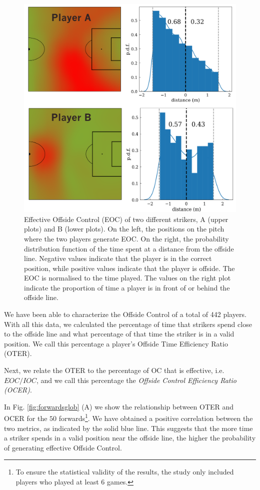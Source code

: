 \documentclass[
  10pt,
  twoside,nohyper]{book}
\begin{document}
\begin{figure}[H]

{\centering \includegraphics[width=0.7\linewidth,]{imagenes/forwards_OC} 

}

\caption{Effective Offside Control (EOC) of two different strikers, A (upper plots) and B (lower plots). On the left, the positions on the pitch where the two players generate EOC. On the right, the probability distribution function of the time spent at a distance from the offside line. Negative values indicate that the player is in the correct position, while positive values indicate that the player is offside. The EOC is normalised to the time played. The values on the right plot indicate the proportion of time a player is in front of or behind the offside line.}\label{fig:forwards}
\end{figure}

We have been able to characterize the Offside Control of a total of 442 players. With all this data, we calculated the percentage of time that strikers spend close to the offside line and what percentage of that time the striker is in a valid position. We call this percentage a player's Offside Time Efficiency Ratio (OTER).

Next, we relate the OTER to the percentage of OC that is effective, i.e.~\(EOC/IOC\), and we call this percentage the \emph{Offside Control Efficiency Ratio (OCER)}.

In Fig. \ref{fig:forwardsglob} (A) we show the relationship between OTER and OCER for the \(50\) forwards\footnote{To ensure the statistical validity of the results, the study only included players who played at least 6 games.}. We have obtained a positive correlation between the two metrics, as indicated by the solid blue line. This suggests that the more time a striker spends in a valid position near the offside line, the higher the probability of generating effective Offside Control.
\end{document}
